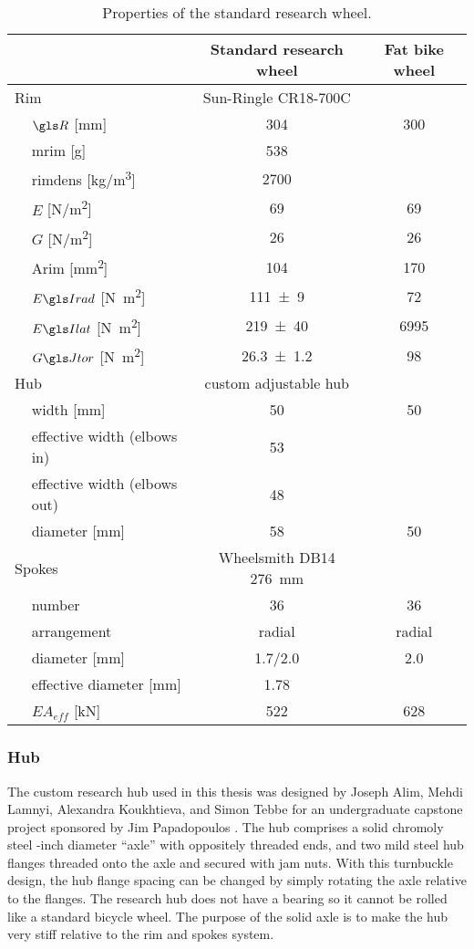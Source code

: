\documentclass[../../thesis.tex]{subfiles}
\begin{document}
\begin{table}
\caption{Properties of the standard research wheel.}
\label{tab:standard_wheels}
\begin{tabular}{llcc}
\toprule
&& \textbf{Standard research wheel} & \textbf{Fat bike wheel}\\
\midrule
\multicolumn{2}{l}{Rim}& Sun-Ringle CR18-700C\\
\,& $\R$ [\si{mm}]         & \num{304} & 300\\
\,& \gls{mrim} [\si{g}]    & \num{538}\\
\,& \gls{rimdens} [\si{kg/m^3}] & \num{2700}\\
\,& $E$ [\si{N/m^2}]       & \num{69}        & \num{69}\\
\,& $G$ [\si{N/m^2}]       & \num{26}        & \num{26}\\
\,& \gls{Arim} [\si{mm^2}] & \num{104}       & \num{170}\\
\,& $\EIr$ [\si{N.m^2}]    & \num{111+-9}    & \num{72}\\
\,& $\EIl$ [\si{N.m^2}]    & \num{219+-40}   & \num{6995}\\
\,& $\GJ$   [\si{N.m^2}]   & \num{26.3+-1.2} & \num{98}\\
\multicolumn{2}{l}{Hub} & custom adjustable hub\\
\,& width [\si{mm}]              & 50 & 50\\
\,& effective width (elbows in)  & 53\\
\,& effective width (elbows out) & 48\\
\,& diameter [\si{mm}]           & 58 & 50\\
\multicolumn{2}{l}{Spokes} & Wheelsmith DB14 \SI{276}{mm}\\
\,& number                 & 36      & 36\\
\,& arrangement            & radial  & radial\\
\,& diameter [\si{mm}]     & 1.7/2.0 & 2.0\\
\,& effective diameter [\si{mm}]     & 1.78\\
\,& $EA_{eff}$ [\si{kN}]   & 522     & 628\\
\bottomrule
\end{tabular}
\end{table}

\subsubsection*{Hub}
The custom research hub used in this thesis was designed by Joseph Alim, Mehdi Lamnyi, Alexandra Koukhtieva, and Simon Tebbe for an undergraduate capstone project sponsored by Jim Papadopoulos \cite{Alim2016}. The hub comprises a solid chromoly steel -inch diameter ``axle'' with oppositely threaded ends, and two mild steel hub flanges threaded onto the axle and secured with jam nuts. With this turnbuckle design, the hub flange spacing can be changed by simply rotating the axle relative to the flanges. The research hub does not have a bearing so it cannot be rolled like a standard bicycle wheel. The purpose of the solid axle is to make the hub very stiff relative to the rim and spokes system.
\end{document}
